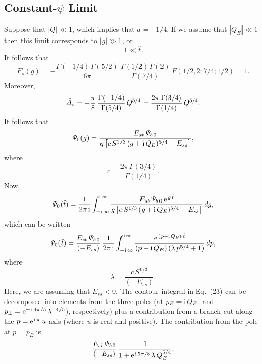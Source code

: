 \documentclass[titlepage=false,12pt]{article}
\begin{document}
\subsection{Constant-$\psi$ Limit}
Suppose that $|Q|\ll 1$, which implies that $a=-1/4$. If we assume that $|Q_E|\ll 1$ then this limit corresponds to $|g|\gg 1$, or 
\begin{equation}
1\ll \hat{t}.
\end{equation}
It follows that 
\begin{equation}
F_s(g) = - \frac{\Gamma(-1/4)\,\Gamma(5/2)}{6\pi} \,\frac{\Gamma(1/2)\,\Gamma(2)}{\Gamma(7/4)}\,F(1/2, 2;7/4;1/2)=1.
\end{equation}
Moreover,
\begin{equation}
\hat{\mit\Delta}_s = -\frac{\pi}{8}\,\frac{\Gamma(-1/4)}{\Gamma(5/4)}\,Q^{5/4}= \frac{2\pi\,\Gamma(3/4)}{\Gamma(1/4)}\,Q^{5/4}.
\end{equation}
It follows that
\begin{equation}
\bar{\mit\Psi}_0(g) = \frac{E_{sb}\,{\mit\Psi}_{b\,0}}{g\left[c\,S^{1/3}\,(g+{\rm i}\,Q_E)^{5/4}-E_{ss}\right]},
\end{equation}
where
\begin{equation}
c =  \frac{2\pi\,\Gamma(3/4)}{\Gamma(1/4)}.
\end{equation}
Now,
\begin{equation}
{\mit\Psi}_0(\hat{t}) = \frac{1}{2\pi\,{\rm i}}\int_{-{\rm i}\,\infty}^{{\rm i}\,\infty}
\frac{E_{sb}\,{\mit\Psi}_{b\,0}\,{\rm e}^{\,g\,\hat{t}}}{g\left[c\,S^{1/3}\,(g+{\rm i}\,Q_E)^{5/4}-E_{ss}\right]}\,dg,
\end{equation}
which can be written
\begin{equation}\label{e23}
{\mit\Psi}_0(\hat{t}) = \frac{E_{sb}\,{\mit\Psi}_{b\,0}}{(-E_{ss})}\,\frac{1}{2\pi\,{\rm i}}\int_{-{\rm i}\,\infty}^{{\rm i}\,\infty}
\frac{{\rm e}^{\,(p-{\rm i}\,Q_E)\,\hat{t}}}{(p-{\rm i}\,Q_E)\,(\lambda\,p^{5/4}+1)}\,dp,
\end{equation}
where
\begin{equation}
\lambda = \frac{c\,S^{1/3}}{(-E_{ss})}.
\end{equation}
Here, we are assuming that $E_{ss}<0$. 
The contour integral in Eq.~(23) can be decomposed into elements from the three poles (at $p_E = {\rm i}\,Q_E$, and 
$p_\pm= {\rm e}^{\pm\,{\rm i}\,4\pi/5}\,\lambda^{-4/5}$), respectively) plus a contribution from a branch cut along the $p=
{\rm e}^{\,{\rm i}\,\pi}\,u$ axis (where $u$ is real and positive).
The contribution from the pole at $p=p_E$ is
\begin{equation}
\frac{E_{sb}\,{\mit\Psi}_{b\,0}}{(-E_{ss})}\,\frac{1}{1+{\rm e}^{\,{\rm i}\,5\pi/8}\,\lambda\,Q_E^{5/4}}.
\end{equation}
\end{document}
